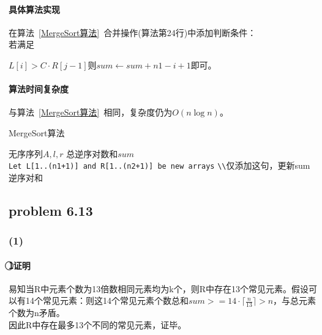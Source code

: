 \documentclass[11pt]{ctexart}
\begin{document}
	\paragraph{具体算法实现}
	在算法~\ref{MergeSort算法}\ 合并操作(算法第24行)中添加判断条件：\\
	若满足{$L[i]>C\cdot R[j-1]$则$sum\gets sum+n1-i+1$即可。
	\paragraph{算法时间复杂度}与算法~\ref{MergeSort算法}\ 相同，复杂度仍为$O(n\log n)$。
	\begin{algorithm}
		\caption{MergeSort算法}
		\label{MergeSort算法}
		\begin{algorithmic}[1]
			\Require 无序序列$A,l,r$
			\Ensure  总逆序对数和$sum$
			\EndFunction
			\\
			\verb|Let L[1..(n1+1)] and R[1..(n2+1)] be new arrays|
			\EndFor
			\EndFor
				\Else
				\verb|\\|仅添加这句，更新sum逆序对和
				\EndIf
			\EndFor
			\EndFunction
		\end{algorithmic}
	\end{algorithm}
	\newpage
	\subsection*{problem 6.13}
	\subsubsection*{(1)}
	\paragraph{\textcircled{1}证明}易知当R中元素个数为13倍数相同元素均为k个，则R中存在13个常见元素。假设可以有14个常见元素：则这14个常见元素个数总和$sum>=14\cdot\lceil\frac{n}{13}\rceil>n$，与总元素个数为n矛盾。\\
	因此R中存在最多13个不同的常见元素，证毕。
}
\end{document}
